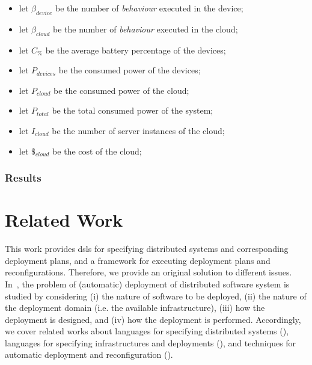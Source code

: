 \documentclass[conference]{IEEEtran}
\begin{document}
\begin{itemize}
    \item let $\beta_{device}$ be the number of \emph{behaviour} executed in the device;
    \item let $\beta_{cloud}$ be the number of \emph{behaviour} executed in the cloud;
    \item let $C_{\%}$ be the average battery percentage of the devices;
    \item let $P_{devices}$ be the consumed power of the devices;
    \item let $P_{cloud}$ be the consumed power of the cloud;
    \item let $P_{total}$ be the total consumed power of the system;
    \item let $I_{cloud}$ be the number of server instances of the cloud;
    \item let $\$_{cloud}$ be the cost of the cloud;
\end{itemize}

\subsubsection{Results}



\section{Related Work}

This work provides 
 \acp{dsl}
 for specifying 
 distributed systems and
 corresponding deployment plans,
 and a framework for executing
 deployment plans and reconfigurations.
%
Therefore, we provide an original solution
 to different issues.
%
In~\cite{DBLP:journals/jss/ArcangeliBL15},
the problem of (automatic) deployment of distributed software system is studied by considering
 (i) the nature of software to be deployed,
 (ii) the nature of the deployment domain (i.e. the available infrastructure),
 (iii) how the deployment is designed,
 and 
 (iv) how the deployment is performed.
%
Accordingly, 
 we cover related works about
 languages for 
 specifying distributed systems (),
 languages for specifying infrastructures and deployments (),
 and
 techniques for automatic deployment and reconfiguration ().
 
 
 
\end{document}
